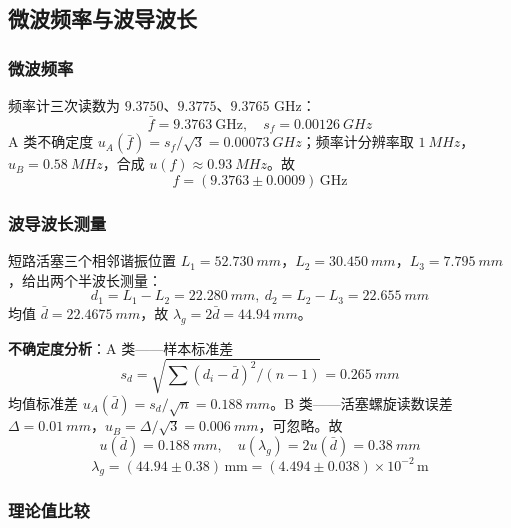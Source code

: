 \documentclass[a4paper,8pt,twocolumn]{article}
\begin{document}
\subsection{微波频率与波导波长}

\subsubsection*{微波频率}

频率计三次读数为 $9.3750$、$9.3775$、$9.3765$ GHz：
\begin{equation*}
\bar{f}=9.3763~\text{GHz},\quad s_f=\SI{0.00126}{GHz}
\end{equation*}
A 类不确定度 $u_A(\bar{f})=s_f/\sqrt{3}=\SI{0.00073}{GHz}$；频率计分辨率取 $\SI{1}{MHz}$，$u_B=\SI{0.58}{MHz}$，合成 $u(f)\approx\SI{0.93}{MHz}$。故
\begin{equation*}
f=(9.3763\pm 0.0009)\,\text{GHz}
\end{equation*}

\subsubsection*{波导波长测量}

短路活塞三个相邻谐振位置 $L_1=\SI{52.730}{mm}$，$L_2=\SI{30.450}{mm}$，$L_3=\SI{7.795}{mm}$，给出两个半波长测量：
\begin{equation*}
d_1=L_1-L_2=\SI{22.280}{mm},\ d_2=L_2-L_3=\SI{22.655}{mm}
\end{equation*}
均值 $\bar d=\SI{22.4675}{mm}$，故 $\lambda_g=2\bar d=\SI{44.94}{mm}$。

\noindent\textbf{不确定度分析}：A 类——样本标准差
\begin{equation*}
s_d=\sqrt{\sum(d_i-\bar d)^2/(n-1)}=\SI{0.265}{mm}
\end{equation*}
均值标准差 $u_A(\bar d)=s_d/\sqrt{n}=\SI{0.188}{mm}$。B 类——活塞螺旋读数误差 $\Delta=\SI{0.01}{mm}$，$u_B=\Delta/\sqrt{3}=\SI{0.006}{mm}$，可忽略。故
\begin{equation*}
u(\bar d)=\SI{0.188}{mm},\quad u(\lambda_g)=2u(\bar d)=\SI{0.38}{mm}
\end{equation*}
\begin{equation*}
\boxed{\lambda_g=(44.94\pm 0.38)\,\text{mm}=(4.494\pm 0.038)\!\times\!10^{-2}\,\text{m}}
\end{equation*}

\subsubsection*{理论值比较}
\end{document}

